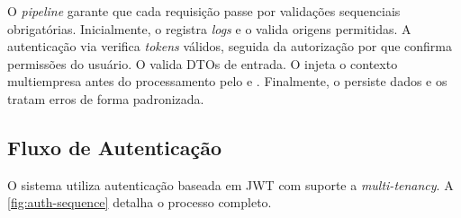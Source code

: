 O \textit{pipeline} garante que cada requisição passe por validações sequenciais obrigatórias. Inicialmente, o  registra \textit{logs} e o  valida origens permitidas. A autenticação via  verifica \textit{tokens} válidos, seguida da autorização por  que confirma permissões do usuário. O  valida DTOs de entrada. O  injeta o contexto multiempresa antes do processamento pelo  e . Finalmente, o  persiste dados e os  tratam erros de forma padronizada.

\subsection{Fluxo de Autenticação}

O sistema utiliza autenticação baseada em JWT com suporte a \textit{multi-tenancy}. A \autoref{fig:auth-sequence} detalha o processo completo.

